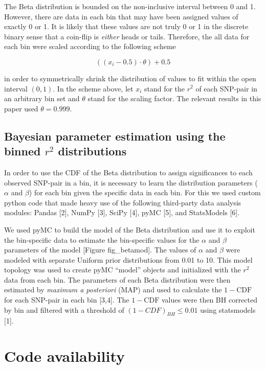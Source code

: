 \documentclass[letterpaper]{scrartcl}
\begin{document}
The Beta distribution is bounded on the non-inclusive interval between 0
and 1. However, there are data in each bin that may have been assigned
values of exactly 0 or 1. It is likely that these values are not truly 0
or 1 in the discrete binary sense that a coin-flip is \emph{either}
heads or tails. Therefore, the all data for each bin were scaled
according to the following scheme

\[((x_i - 0.5)\cdot \theta) + 0.5\]

in order to symmetrically shrink the distribution of values to fit
within the open interval \((0,1)\). In the scheme above, let \(x_i\)
stand for the \(r^2\) of each SNP-pair in an arbitrary bin set and
\(\theta\) stand for the scaling factor. The relevant results in this
paper used \(\theta = 0.999\).

\subsection{Bayesian parameter estimation using the binned \(r^2\)
distributions}\label{bayesian-parameter-estimation-using-the-binned-r2-distributions}

In order to use the CDF of the Beta distribution to assign significances
to each observed SNP-pair in a bin, it is necessary to learn the
distribution parameters (\(\alpha\) and \(\beta\)) for each bin given
the specific data in each bin. For this we used custom python code that
made heavy use of the following third-party data analysis modules:
Pandas {[}2{]}, NumPy {[}3{]}, SciPy {[}4{]}, pyMC {[}5{]}, and
StatsModels {[}6{]}.

We used pyMC to build the model of the Beta distribution and use it to
exploit the bin-specific data to estimate the bin-specific values for
the \(\alpha\) and \(\beta\) parameters of the model {[}Figure
fig\_betamod{]}. The values of \(\alpha\) and \(\beta\) were modeled
with separate Uniform prior distributions from 0.01 to 10. This model
topology was used to create pyMC ``model'' objects and initialized with
the \(r^2\) data from each bin. The parameters of each Beta distribution
were then estimated by \emph{maximum a posteriori} (MAP) and used to
calculate the \(1-\mathrm{CDF}\) for each SNP-pair in each bin
{[}3,4{]}. The \(1-\mathrm{CDF}\) values were then BH corrected by bin
and filtered with a threshold of \((1-CDF)_{BH} \le 0.01\) using
statsmodels {[}1{]}.

\section{Code availability}\label{code-availability}
\end{document}
